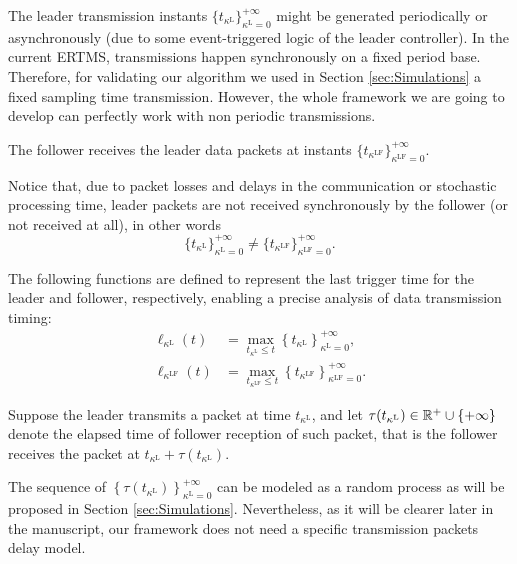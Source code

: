 \documentclass[letterpaper, 10 pt, conference]{ieeeconf}
\theoremstyle{definition}
\theoremstyle{nopoint}
\begin{document}
The leader transmission instants \(\{ t_{\kappa^\mathrm{L}} \}_{\kappa^\mathrm{L}=0}^{+\infty}\) might be generated periodically or asynchronously (due to some event-triggered logic of the leader controller). In the current ERTMS, transmissions happen synchronously on a fixed period base. Therefore, for validating our algorithm we used in Section \ref{sec:Simulations} 
a fixed sampling time transmission. However, the whole framework we are going to develop can perfectly work with non periodic transmissions. 

The follower receives the leader data packets at instants  \(\{ t_{\kappa^\mathrm{LF}} \}_{\kappa^\mathrm{LF}=0}^{+\infty}\).

Notice that, due to packet losses and delays  in the communication or stochastic processing time, leader packets are not received synchronously by the follower (or not received at all), in other words
	\[\{ t_{\kappa^\mathrm{L}} \}_{\kappa^\mathrm{L}=0}^{+\infty} \neq \{ t_{\kappa^\mathrm{LF}} \}_{\kappa^\mathrm{LF}=0}^{+\infty}.\]
	


The following functions are defined to represent the last trigger time for the leader and follower, respectively, enabling a precise analysis of data transmission timing:
\begin{align*}
	\ell_{\kappa^\mathrm{L}}(t) &= \max_{t_{\kappa^\mathrm{L}} \leq t} \left \{ t_{\kappa^\mathrm{L}} \right \}_{\kappa^\mathrm{L}=0}^{+\infty}, \\
	\ell_{\kappa^\mathrm{LF}}(t) &= \max_{t_{\kappa^\mathrm{LF}} \leq t} \left \{ t_{\kappa^\mathrm{LF}} \right \}_{\kappa^\mathrm{LF}=0}^{+\infty}.
\end{align*}


Suppose the leader transmits a packet at time $t_{\kappa^\mathrm{L}}$, and let $\tau(t_{\kappa^\mathrm{L}})\in \Bbb{R}^+ \cup \{+\infty\}$ denote the elapsed time of follower reception of such packet, that is the follower receives the packet at $t_{\kappa^\mathrm{L}} + \tau(t_{\kappa^\mathrm{L}})$. 


The sequence of $ \left\{ \tau(t_{\kappa^\mathrm{L}})\right\}_{\kappa^\mathrm{L}=0}^{+\infty}$ can be modeled as a random process as will be proposed in Section \ref{sec:Simulations}. Nevertheless, as it will be clearer later in the manuscript, our framework does not need a specific transmission packets delay model.
\end{document}
